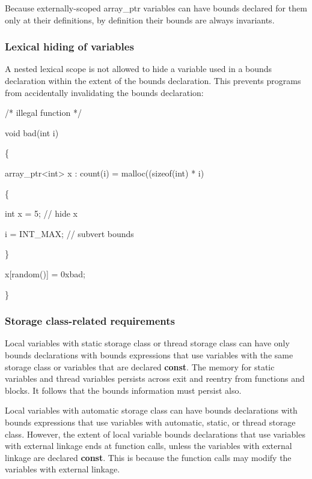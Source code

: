 \documentclass[]{article}
\begin{document}
Because externally-scoped array\_ptr variables can have bounds declared
for them only at their definitions, by definition their bounds are
always invariants.

\subsubsection{\texorpdfstring{\protect\hypertarget{ux5fToc435434933}{}{\protect\hypertarget{ux5fToc437460754}{}{\protect\hypertarget{ux5fToc440445432}{}{\protect\hypertarget{ux5fToc440449214}{}{\protect\hypertarget{ux5fToc440551864}{}{}}}}}Lexical
hiding of variables
}{Lexical hiding of variables }}\label{lexical-hiding-of-variables}

A nested lexical scope is not allowed to hide a variable used in a
bounds declaration within the extent of the bounds declaration. This
prevents programs from accidentally invalidating the bounds declaration:

/* illegal function */

void bad(int i)

\{

array\_ptr\textless{}int\textgreater{} x : count(i) =
malloc((sizeof(int) * i)

\{

int x = 5; // hide x

i = INT\_MAX; // subvert bounds

\}

x{[}random(){]} = 0xbad;

\}

\subsubsection{\texorpdfstring{\protect\hypertarget{ux5fToc435434934}{}{\protect\hypertarget{ux5fToc437460755}{}{\protect\hypertarget{ux5fToc440445433}{}{\protect\hypertarget{ux5fToc440449215}{}{\protect\hypertarget{ux5fToc440551865}{}{}}}}}Storage
class-related
requirements}{Storage class-related requirements}}\label{storage-class-related-requirements}

Local variables with static storage class or thread storage class can
have only bounds declarations with bounds expressions that use variables
with the same storage class or variables that are declared
\textbf{const}. The memory for static variables and thread variables
persists across exit and reentry from functions and blocks. It follows
that the bounds information must persist also.

Local variables with automatic storage class can have bounds
declarations with bounds expressions that use variables with automatic,
static, or thread storage class. However, the extent of local variable
bounds declarations that use variables with external linkage ends at
function calls, unless the variables with external linkage are declared
\textbf{const}. This is because the function calls may modify the
variables with external linkage.
\end{document}
